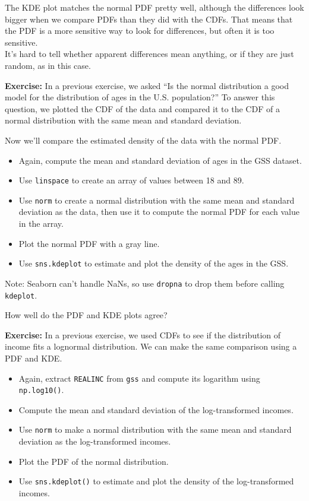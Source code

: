 The KDE plot matches the normal PDF pretty well, although the
differences look bigger when we compare PDFs than they did with the
CDFs. That means that the PDF is a more sensitive way to look for
differences, but often it is too sensitive.\\
It's hard to tell whether apparent differences mean anything, or if they
are just random, as in this case.

\textbf{Exercise:} In a previous exercise, we asked ``Is the normal
distribution a good model for the distribution of ages in the U.S.
population?'' To answer this question, we plotted the CDF of the data
and compared it to the CDF of a normal distribution with the same mean
and standard deviation.

Now we'll compare the estimated density of the data with the normal PDF.

\begin{itemize}
\item
  Again, compute the mean and standard deviation of ages in the GSS
  dataset.
\item
  Use \passthrough{\lstinline!linspace!} to create an array of values
  between 18 and 89.
\item
  Use \passthrough{\lstinline!norm!} to create a normal distribution
  with the same mean and standard deviation as the data, then use it to
  compute the normal PDF for each value in the array.
\item
  Plot the normal PDF with a gray line.
\item
  Use \passthrough{\lstinline!sns.kdeplot!} to estimate and plot the
  density of the ages in the GSS.
\end{itemize}

Note: Seaborn can't handle NaNs, so use \passthrough{\lstinline!dropna!}
to drop them before calling \passthrough{\lstinline!kdeplot!}.

How well do the PDF and KDE plots agree?

\textbf{Exercise:} In a previous exercise, we used CDFs to see if the
distribution of income fits a lognormal distribution. We can make the
same comparison using a PDF and KDE.

\begin{itemize}
\item
  Again, extract \passthrough{\lstinline!REALINC!} from
  \passthrough{\lstinline!gss!} and compute its logarithm using
  \passthrough{\lstinline!np.log10()!}.
\item
  Compute the mean and standard deviation of the log-transformed
  incomes.
\item
  Use \passthrough{\lstinline!norm!} to make a normal distribution with
  the same mean and standard deviation as the log-transformed incomes.
\item
  Plot the PDF of the normal distribution.
\item
  Use \passthrough{\lstinline!sns.kdeplot()!} to estimate and plot the
  density of the log-transformed incomes.
\end{itemize}

